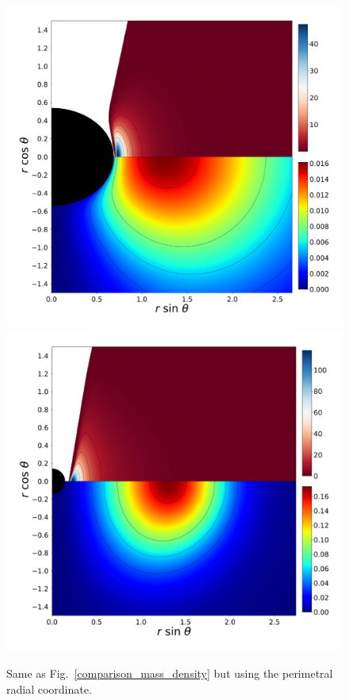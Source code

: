 \documentclass[twocolumn,aps,showpacs,showkeys,prd,superscriptaddress,byrevtex, amsmath]{revtex4-1}
\begin{document}
\begin{figure}
\includegraphics[scale=0.12]{figures/fig6_IV__10.pdf}
\hspace{-0.4cm}
\includegraphics[scale=0.12]{figures/fig6_VII__10.pdf}
\hspace{-0.2cm}
\caption{Same as Fig.~\ref{comparison_mass_density} but using the perimetral radial coordinate.  }
\label{comparison_mass_density_peri}
\end{figure}
\end{document}
